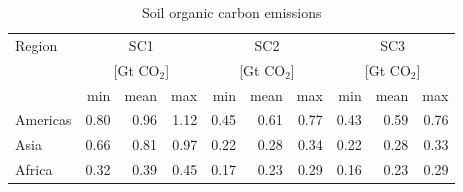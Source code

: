 \begin{table}
	\centering
	\caption[Soil organic carbon emissions]{Soil organic carbon emissions}
	\label{tab:soce_tab}
	\begin{tabular}{lrrrrrrrrr}
		\hline
		\multirow{3}{*}{Region} & \multicolumn{3}{c}{SC1}& \multicolumn{3}{c}{SC2} & \multicolumn{3}{c}{SC3} \\
		 & \multicolumn{3}{c}{[Gt CO$_2$]}& \multicolumn{3}{c}{[Gt CO$_2$]} & \multicolumn{3}{c}{[Gt CO$_2$]} \\
		 & min & mean & max & min & mean & max & min & mean & max \\\hline
		Americas & 0.80 & 0.96 & 1.12 & 0.45 & 0.61 & 0.77 & 0.43 & 0.59 & 0.76 \\
		Asia & 0.66 & 0.81 & 0.97 & 0.22 & 0.28 & 0.34 & 0.22 & 0.28 & 0.33 \\
		Africa & 0.32 & 0.39 & 0.45 & 0.17 & 0.23 & 0.29 & 0.16 & 0.23 & 0.29 \\\hline
	\end{tabular}
\end{table}

